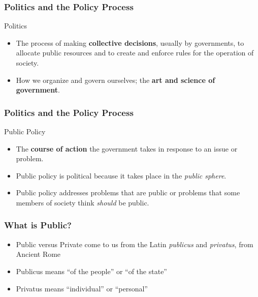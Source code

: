 \documentclass[10pt]{beamer}
\begin{document}
\begin{frame}
\frametitle{Politics and the Policy Process}

\begin{block}{Politics}
\begin{itemize}
\item<1-> The process of making \textbf{collective decisions}, usually by governments, to allocate public resources and to create and enforce rules for the operation of society.

\item<2-> How we organize and govern ourselves; the \textbf{art and science of government}.
\end{itemize}
\end{block}

\end{frame}

\begin{frame}
\frametitle{Politics and the Policy Process}

\begin{block}{Public Policy}
\begin{itemize}
\item<1-> The \textbf{course of action} the government takes in response to an issue or problem.

\item<2-> Public policy is political because it takes place in the \emph{public sphere}.

\item<3-> Public policy addresses problems that are public or problems that some members of society think \emph{should} be public.
\end{itemize}
\end{block}

\end{frame}

\begin{frame}
\frametitle{What is Public?}

\pause
\begin{itemize}
\item Public versus Private come to us from the Latin \emph{publicus} and \emph{privatus}, from Ancient Rome
\item Publicus means ``of the people'' or ``of the state''
\item Privatus means ``individual'' or ``personal''
\end{itemize}

\end{frame}
\end{document}
